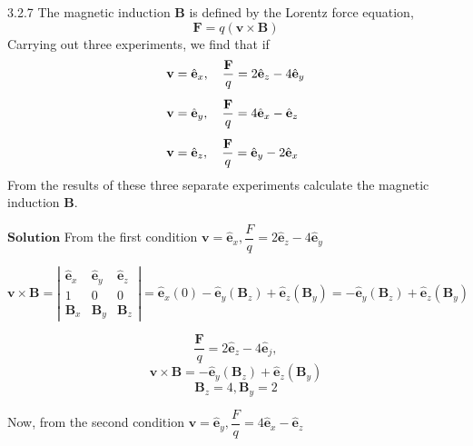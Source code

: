 \begin{mybox}{3.2.7}
The magnetic induction $\mathbf{B}$ is defined by the Lorentz force equation,
$$
\mathbf{F}=q(\mathbf{v} \times \mathbf{B})
$$
Carrying out three experiments, we find that if
$$
\begin{array}{l}{\mathbf{v}=\hat{\mathbf{e}}_{x}, \quad \dfrac{\mathbf{F}}{q}=2 \hat{\mathbf{e}}_{z}-4 \hat{\mathbf{e}}_{y}}\vspace{3mm} \\ {\mathbf{v}=\hat{\mathbf{e}}_{y}, \quad \dfrac{\mathbf{F}}{q}=4 \hat{\mathbf{e}}_{x}-\hat{\mathbf{e}}_{z}} \vspace{3mm}\\ {\mathbf{v}=\hat{\mathbf{e}}_{z}, \quad \dfrac{\mathbf{F}}{q}=\hat{\mathbf{e}}_{y}-2 \hat{\mathbf{e}}_{x}}\end{array}
$$
From the results of these three separate experiments calculate the magnetic induction $\mathbf{B}$.
\end{mybox}



$\boxed{\textbf{Solution}}$ From the first condition $\mathbf{v}=\hat{\mathbf{e}}_{x}, \dfrac{F}{q}=2 \hat{\mathbf{e}}_{z}-4 \hat{\mathbf{e}}_{\dot{y}}$

$$
\mathbf{v} \times \mathbf{B}=\left|\begin{array}{ccc}
\hat{\mathbf{e}}_{x} & \hat{\mathbf{e}}_{y} & \hat{\mathbf{e}}_{z} \\
1 & 0 & 0 \\
\mathbf{B}_{x} & \mathbf{B}_{y} & \mathbf{B}_{z}
\end{array}\right|=\hat{\mathbf{e}}_{x}(0)-\hat{\mathbf{e}}_{y}\left(\mathbf{B}_{z}\right)+\hat{\mathbf{e}}_{z}\left(\mathbf{B}_{y}\right)=-\hat{\mathbf{e}}_{y}\left(\mathbf{B}_{z}\right)+\hat{\mathbf{e}}_{z}\left(\mathbf{B}_{y}\right)
$$

$$\frac{\mathbf{F}}{q}=2 \hat{\mathbf{e}}_{z}-4 \hat{\mathbf{e}}_{j},$$
$$ \mathbf{v} \times \mathbf{B}=-\hat{\mathbf{e}}_{y}\left(\mathbf{B}_{z}\right)+\hat{\mathbf{e}}_{z}\left(\mathbf{B}_{y}\right)$$
$$\mathbf{B}_{z}=4, \mathbf{B}_{y}=2$$

Now, from the second condition $\mathbf{v}=\hat{\mathbf{e}}_{y}, \dfrac{F}{q}=4 \hat{\mathbf{e}}_{x}-\hat{\mathbf{e}}_{z}$

